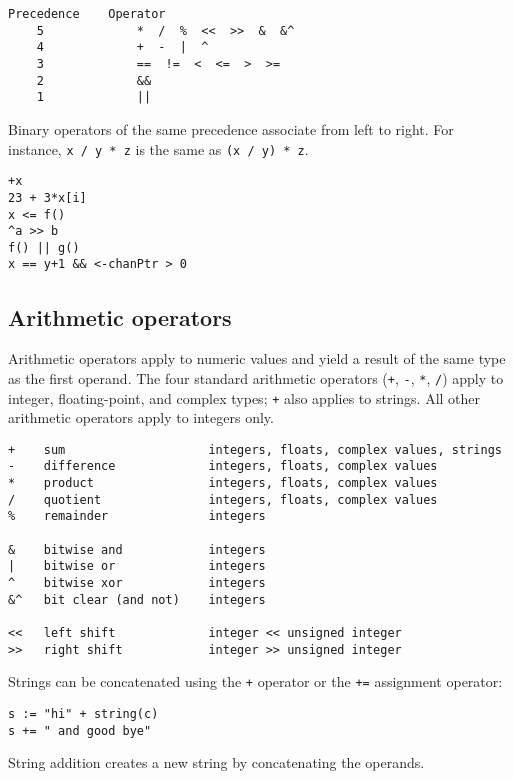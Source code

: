 {\begin{Verbatim}[frame=single]
Precedence    Operator
    5             *  /  %  <<  >>  &  &^
    4             +  -  |  ^
    3             ==  !=  <  <=  >  >=
    2             &&
    1             ||
\end{Verbatim}

Binary operators of the same precedence associate from left to right.
For instance, \texttt{x / y * z} is the same as \texttt{(x / y) * z}.

\begin{Verbatim}[frame=single]
+x
23 + 3*x[i]
x <= f()
^a >> b
f() || g()
x == y+1 && <-chanPtr > 0
\end{Verbatim}

\subsection*{Arithmetic operators}

Arithmetic operators apply to numeric values and yield a result of the
same type as the first operand. The four standard arithmetic operators
(\texttt{+}, \texttt{-}, \texttt{*}, \texttt{/}) apply to integer,
floating-point, and complex types; \texttt{+} also applies to strings.
All other arithmetic operators apply to integers only.

\begin{Verbatim}[frame=single]
+    sum                    integers, floats, complex values, strings
-    difference             integers, floats, complex values
*    product                integers, floats, complex values
/    quotient               integers, floats, complex values
%    remainder              integers

&    bitwise and            integers
|    bitwise or             integers
^    bitwise xor            integers
&^   bit clear (and not)    integers

<<   left shift             integer << unsigned integer
>>   right shift            integer >> unsigned integer
\end{Verbatim}

Strings can be concatenated using the \texttt{+} operator or the
\texttt{+=} assignment operator:

\begin{Verbatim}[frame=single]
s := "hi" + string(c)
s += " and good bye"
\end{Verbatim}

String addition creates a new string by concatenating the operands.

}
